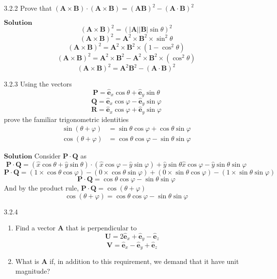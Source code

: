 \documentclass{styles/kaobook}
\begin{document}
\begin{greenbox}{3.2.2}
Prove that $(\mathbf{A} \times \mathbf{B}) \cdot(\mathbf{A} \times \mathbf{B})=(\mathbf{A} \mathbf{B})^{2}-(\mathbf{A} \cdot \mathbf{B})^{2}$
\end{greenbox}


$\boxed{\textbf{Solution}}$
$$(\mathbf{A} \times \mathbf{B})^{2}=(|\mathbf{A}||\mathbf{B}| \sin \theta)^{2}$$
$$(\mathbf{A} \times \mathbf{B})^{2}=\mathbf{A}^{2} \times \mathbf{B}^{2} \times \sin ^{2} \theta$$
$$(\mathbf{A} \times \mathbf{B})^{2}=\mathbf{A}^{2} \times \mathbf{B}^{2} \times\left(1-\cos ^{2} \theta\right)$$
$$(\mathbf{A} \times \mathbf{B})^{2}=\mathbf{A}^{2} \times \mathbf{B}^{2}-\mathbf{A}^{2} \times \mathbf{B}^{2} \times\left(\cos ^{2} \theta\right)$$
$$(\mathbf{A} \times \mathbf{B})^{2}=\mathbf{A}^{2} \mathbf{B}^{2}-(\mathbf{A} \cdot \mathbf{B})^{2}$$



\begin{greenbox}{3.2.3}
Using the vectors
$$\mathbf{P}=\hat{\mathbf{e}}_{x} \cos \theta+\hat{\mathbf{e}}_{y} \sin \theta$$
$$\mathbf{Q}=\hat{\mathbf{e}}_{x} \cos \varphi-\hat{\mathbf{e}}_{y} \sin \varphi$$
$$\mathbf{R}=\hat{\mathbf{e}}_{x} \cos \varphi+\hat{\mathbf{e}}_{y} \sin \varphi$$
prove the familiar trigonometric identities
$$
\begin{aligned} \sin (\theta+\varphi) &=\sin \theta \cos \varphi+\cos \theta \sin \varphi \\ \cos (\theta+\varphi) &=\cos \theta \cos \varphi-\sin \theta \sin \varphi \end{aligned}
$$
\end{greenbox}

$\boxed{\textbf{Solution}}$ Consider $\mathbf{P}\cdot \mathbf{Q}$ as
$$\mathbf{P}\cdot \mathbf{Q} = (\hat{x} \cos \theta+\hat{y} \sin \theta) \cdot\left(\hat{x} \cos \varphi-\hat{y} \sin \varphi\right)+\hat{y} \sin \theta \hat{x} \cos \varphi-\hat{y} \sin \theta \sin \varphi$$
$$\mathbf{P}\cdot \mathbf{Q} = (1 \times \cos \theta \cos \varphi)-(0 \times \cos \theta \sin \varphi)+(0 \times \sin \theta \cos \varphi) - (1\times \sin \theta \sin \varphi)$$
$$\mathbf{P}\cdot \mathbf{Q} = \cos \theta \cos \varphi-\sin \theta \sin \varphi$$
And by the product rule, $\mathbf{P}\cdot \mathbf{Q} = \cos(\theta + \varphi)$
$$\cos (\theta+\varphi)=\cos \theta \cos \varphi-\sin \theta \sin \varphi$$



 
\begin{greenbox}{3.2.4}
\begin{enumerate}[$(a)$]
\item Find a vector $\mathbf{A}$ that is perpendicular to
$$\mathbf{U}=2 \hat{\mathbf{e}}_{x}+\hat{\mathbf{e}}_{y}-\hat{\mathbf{e}}_{z}$$
$$\mathbf{V}=\hat{\mathbf{e}}_{x}-\hat{\mathbf{e}}_{y}+\hat{\mathbf{e}}_{z}$$
\item What is $\mathbf{A}$ if, in addition to this requirement, we demand that it have unit
magnitude?
\end{enumerate}
\end{greenbox}
\end{document}
